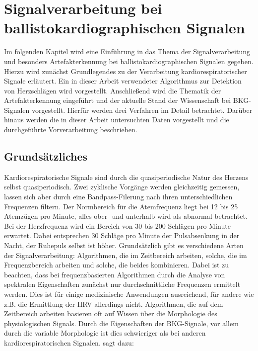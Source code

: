 \chapter{Signalverarbeitung bei ballistokardiographischen Signalen}

Im folgenden Kapitel wird eine Einführung in das Thema der Signalverarbeitung und besonders Artefakterkennung bei ballistokardiographischen Signalen gegeben. Hierzu wird zunächst Grundlegendes zu der Verarbeitung kardiorespiratorischer Signale erläutert. Ein in dieser Arbeit verwendeter Algorithmus zur Detektion von Herzschlägen wird vorgestellt. Anschließend wird die Thematik der Artefakterkennung eingeführt und der aktuelle Stand der Wissenschaft bei \ac{BKG}-Signalen vorgestellt. Hierfür werden drei Verfahren im Detail betrachtet. Darüber hinaus werden die in dieser Arbeit untersuchten Daten vorgestellt und die durchgeführte Vorverarbeitung beschrieben.

\section{Grundsätzliches} %

	Kardiorespiratorische Signale sind durch die quasiperiodische Natur des Herzens selbst quasiperiodisch. Zwei zyklische Vorgänge werden gleichzeitig gemessen, lassen sich aber durch eine Bandpass-Filerung nach ihren unterschiedlichen Frequenzen filtern. Der Normbereich für die Atemfrequenz liegt bei 12 bis 25 Atemzügen pro Minute, alles ober- und unterhalb wird als abnormal betrachtet. Bei der Herzfrequenz wird ein Bereich von 30 bis 200 Schlägen pro Minute erwartet. Dabei entsprechen 30 Schläge pro Minute der Pulsabsenkung in der Nacht, der Ruhepuls selbst ist höher. Grundsätzlich gibt es verschiedene Arten der Signalverarbeitung: Algorithmen, die im Zeitbereich arbeiten, solche, die im Frequenzbereich arbeiten und solche, die beides kombinieren. Dabei ist zu beachten, dass bei frequenzbasierten Algorithmen durch die Analyse von spektralen Eigenschaften zunächst nur durchschnittliche Frequenzen ermittelt werden. Dies ist für einige medizinische Anwendungen ausreichend, für andere wie z.B. die Ermittlung der \ac{HRV} allerdings nicht. Algorithmen, die auf dem Zeitbereich arbeiten basieren oft auf Wissen über die Morphologie des physiologischen Signals. Durch die Eigenschaften der \ac{BKG}-Signale, vor allem durch die variable Morphologie ist dies schwieriger als bei anderen kardiorespiratorischen Signalen. \citeauthor{Paalasmaa2015} sagt dazu:

